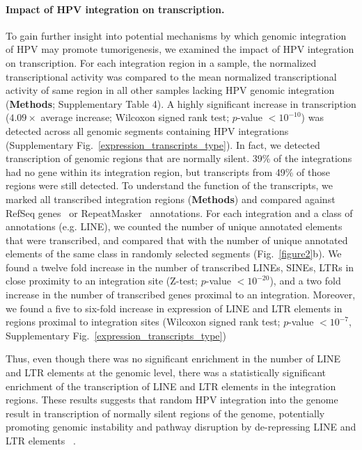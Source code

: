 \documentclass[a4,center,fleqn]{NAR}
\begin{document}
\paragraph{\textbf{Impact of HPV integration on transcription.}} To gain further insight into 
potential mechanisms by which genomic integration of HPV may promote tumorigenesis, we examined the impact
of HPV integration on transcription.  For each integration region in a
sample, the normalized transcriptional activity was compared to the
mean normalized transcriptional activity of same region in all other
samples lacking HPV genomic integration (\textbf{Methods}; Supplementary Table 4). A highly
significant increase in transcription ($4.09\times$ average increase;
Wilcoxon signed rank test; $p$-value $<10^{-10}$) was detected across
all genomic segments containing HPV integrations
(Supplementary Fig.~\ref{expression_transcripts_type}).  In fact, we detected
transcription of genomic regions that are normally silent.  39\% of
the integrations had no gene within its integration region, but
transcripts from 49\% of those regions were still detected. To
understand the function of the transcripts, we marked all transcribed
integration regions (\textbf{Methods}) and compared against RefSeq
genes~\cite{OLeary2016} or RepeatMasker~\cite{Tarailo-Graovac2009}
annotations. For each integration and a class of annotations
(e.g. LINE), we counted the number of unique annotated elements that
were transcribed, and compared that with the number of unique
annotated elements of the same class in randomly selected segments
(Fig.~\ref{figure2}b). We found a twelve fold increase in the number
of transcribed LINEs, SINEs, LTRs in close proximity to an integration
site (Z-test; $p$-value $<10^{-20}$), and a two fold increase in the
number of transcribed genes proximal to an integration.  Moreover, we
found a five to six-fold increase in expression of LINE and LTR
elements in regions proximal to integration sites (Wilcoxon signed
rank test; $p$-value $<10^{-7}$, Supplementary Fig.~\ref{expression_transcripts_type})

Thus, even though there was no significant enrichment in the number of
LINE and LTR elements at the genomic level, there was a statistically
significant enrichment of the transcription of LINE and LTR elements
in the integration regions.  These results suggests that random HPV
integration into the genome result in transcription of normally silent
regions of the genome, potentially promoting genomic instability and
pathway disruption by de-repressing LINE and LTR elements
~\cite{Gasior2006,Kinomoto2007,Romanish2010,Sigurdsson2012,Yu2013,
  Rodic2013,Xiao-Jie2016}.
\end{document}

